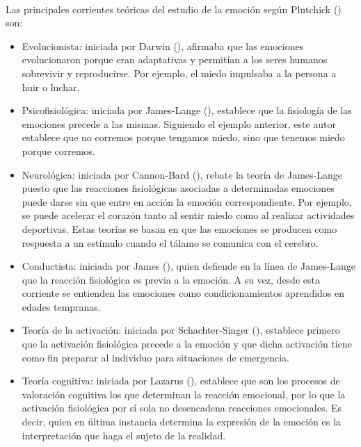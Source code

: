 \paragraph{}
Las principales corrientes teóricas del estudio de la emoción según Plutchick (\citeyear{plutchik1980emotion}) son:
\begin{itemize}
    \item Evolucionista: iniciada por Darwin (\citeyear{darwin1967expresion}), afirmaba que las emociones evolucionaron porque eran adaptativas y permitían a los seres humanos sobrevivir y reproducirse. Por ejemplo, el miedo impulsaba a la persona a huir o luchar.
    
    \item Psicofisiológica: iniciada por James-Lange (\citeyear{emotionJames}), establece que la fisiología de las emociones precede a las mismas. Siguiendo el ejemplo anterior, este autor establece que no corremos porque tengamos miedo, sino que tenemos miedo porque corremos.
    
    \item Neurológica: iniciada por Cannon-Bard (\citeyear{emotionCannon}), rebate la teoría de James-Lange puesto que las reacciones fisiológicas asociadas a determinadas emociones puede darse sin que entre en acción la emoción correspondiente. Por ejemplo, se puede acelerar el corazón tanto al sentir miedo como al realizar actividades deportivas. Estas teorías se basan en que las emociones se producen como respuesta a un estímulo cuando el tálamo se comunica con el cerebro.
    
    \item Conductista: iniciada por James (\citeyear{james2013principles}), quien defiende en la línea de James-Lange que la reacción fisiológica es previa a la emoción. A su vez, desde esta corriente se entienden las emociones como condicionamientos aprendidos en edades tempranas.
    
    \item Teoría de la activación: iniciada por Schachter-Singer (\citeyear{schachter1962cognitive}), establece primero que la activación fisiológica precede a la emoción y que dicha activación tiene como fin preparar al individuo para situaciones de emergencia.

    \item Teoría cognitiva: iniciada por Lazarus (\citeyear{lazarus1970towards}), establece que son los procesos de valoración cognitiva los que determinan la reacción emocional, por lo que la activación fisiológica por sí sola no desencadena reacciones emocionales. Es decir, quien en última instancia determina la expresión de la emoción es la interpretación que haga el sujeto de la realidad.
\end{itemize}

